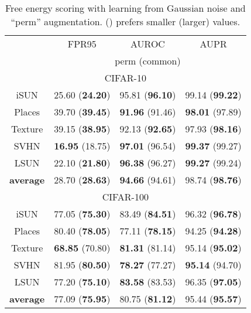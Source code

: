 \documentclass{article}
\begin{document}
\begin{table}[t]
\parbox{.47\linewidth}{
\centering
\caption{{Free energy scoring with learning from Gaussian noise and ``perm'' augmentation.  () prefers smaller (larger) values.}} \label{tab: eneregy perm}
\vspace{5pt}
\scriptsize
{
\begin{tabular}{c|ccc}
\toprule[1.5pt]
                   & FPR95      & AUROC        & AUPR       \\
                   \cline{2-4} 
\multirow{-2}{*}{} & \multicolumn{3}{c}{perm (common)} \\
\midrule[0.6pt]
\multicolumn{4}{c}{\cellcolor{greyL}CIFAR-10} \\
\midrule[0.6pt]
iSUN               & 25.60 (\textbf{24.20}) & 95.81 (\textbf{96.10}) & 99.14 (\textbf{99.22}) \\ 
Places        & 39.70 (\textbf{39.45}) & \textbf{91.96} (91.46) & \textbf{98.01} (97.89) \\
Texture            & 39.15 (\textbf{38.95}) & 92.13 (\textbf{92.65}) & 97.93 (\textbf{98.16}) \\
SVHN               & \textbf{16.95} (18.75) & \textbf{97.01} (96.54) & \textbf{99.37} (99.27) \\
LSUN               & 22.10 (\textbf{21.80}) & \textbf{96.38} (96.27) & \textbf{99.27} (99.24) \\
\midrule
\textbf{average}   & 28.70 (\textbf{28.63}) & \textbf{94.66} (94.61) & {98.74} (\textbf{98.76}) \\ \midrule[1pt]
\multicolumn{4}{c}{\cellcolor{greyL}CIFAR-100} \\
\midrule[1pt]
iSUN               & 77.05 (\textbf{75.30}) & 83.49 (\textbf{84.51}) & 96.32 (\textbf{96.78}) \\ 
Places        & 80.40 (\textbf{78.05}) & 77.11 (\textbf{78.15}) & 94.25 (\textbf{94.28}) \\
Texture            & \textbf{68.85} (70.80) & \textbf{81.31} (81.14) & 95.14 (\textbf{95.02}) \\
SVHN               & 81.95 (\textbf{80.50}) & \textbf{78.27} (77.27) & \textbf{95.14} (94.70) \\
LSUN               & 77.20 (\textbf{75.10}) & \textbf{83.58} (83.53) & 96.35 (\textbf{97.05}) \\
\midrule
\textbf{average}   & 77.09 (\textbf{75.95}) & 80.75 (\textbf{81.12}) & 95.44 (\textbf{95.57}) \\ \bottomrule[1.5pt]      
\end{tabular}
}}
\end{table}
\end{document}
